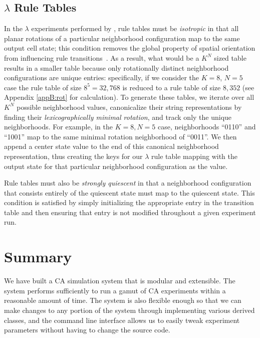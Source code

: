 \documentclass[a4paper,11pt,twoside]{report}
\begin{document}
\subsection{$\lambda$ Rule Tables}
\label{subsec:ch3_lamb}
In the $\lambda$ experiments performed by \citeauthor{wo90}, rule tables must be \textit{isotropic} in that all planar rotations of a particular neighborhood configuration map to the same output cell state; this condition removes the global property of spatial orientation from influencing rule transitions~\cite{av00,wo90}. As a result, what would be a $K^N$ sized table results in a smaller table because only rotationally distinct neighborhood configurations are unique entries: specifically, if we consider the $K=8$, $N=5$ case the rule table of size $8^5 = 32,768$ is reduced to a rule table of size $8,352$ (see Appendix \ref{appB:rot} for calculation). To generate these tables, we iterate over all $K^N$ possible neighborhood values, canonicalize their string representations by finding their \textit{lexicographically minimal rotation}, and track only the unique neighborhoods. For example, in the $K=8, N=5$ case, neighborhoods ``0110'' and ``1001'' map to the same minimal rotation neighborhood of ``0011''. We then append a center state value to the end of this canonical neighborhood representation, thus creating the keys for our $\lambda$ rule table mapping with the output state for that particular neighborhood configuration as the value.

Rule tables must also be \textit{strongly quiescent} in that a neighborhood configuration that consists entirely of the quiescent state must map to the quiescent state. This condition is satisfied by simply initializing the appropriate entry in the transition table and then ensuring that entry is not modified throughout a given experiment run.

\section{Summary}
We have built a CA simulation system that is modular and extensible. The system performs sufficiently to run a gamut of CA experiments within a reasonable amount of time. The system is also flexible enough so that we can make changes to any portion of the system through implementing various derived classes, and the command line interface allows us to easily tweak experiment parameters without having to change the source code.
\end{document}
